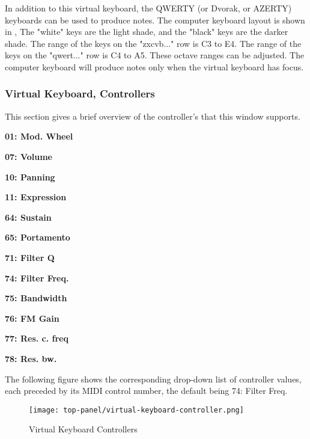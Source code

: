    In addition to this virtual keyboard, the QWERTY (or Dvorak, or AZERTY)
   keyboards can be used to produce notes.
   The computer keyboard layout is shown in
   ,
   The "white" keys are the light shade, and the "black" keys are the
   darker shade.
   The range of the keys on the "zxcvb..." row is C3 to E4.
   The range of the keys on the "qwert..." row is C4 to A5.
   These octave ranges can be adjusted.
   The computer keyboard will produce notes only when the virtual keyboard
   has focus.

\subsubsection{Virtual Keyboard, Controllers}
\label{subsubsec:virtual_keyboard_controllers}

   This section gives a brief overview of the controller's that this
   window supports.

   \begin{enumber}
      \item \textbf{01: Mod. Wheel}
      \item \textbf{07: Volume}
      \item \textbf{10: Panning}
      \item \textbf{11: Expression}
      \item \textbf{64: Sustain}
      \item \textbf{65: Portamento}
      \item \textbf{71: Filter Q}
      \item \textbf{74: Filter Freq.}
      \item \textbf{75: Bandwidth}
      \item \textbf{76: FM Gain}
      \item \textbf{77: Res. c. freq}
      \item \textbf{78: Res. bw.}
   \end{enumber}

      The following figure shows the corresponding drop-down list of controller
      values, each preceded by its MIDI control number, the default being 74: Filter Freq.

\begin{figure}[H]
   \centering
   \texttt{[image: top-panel/virtual-keyboard-controller.png]}
   \caption{Virtual Keyboard Controllers}
   \label{fig:virtual_keyboard_controllers}
\end{figure}

